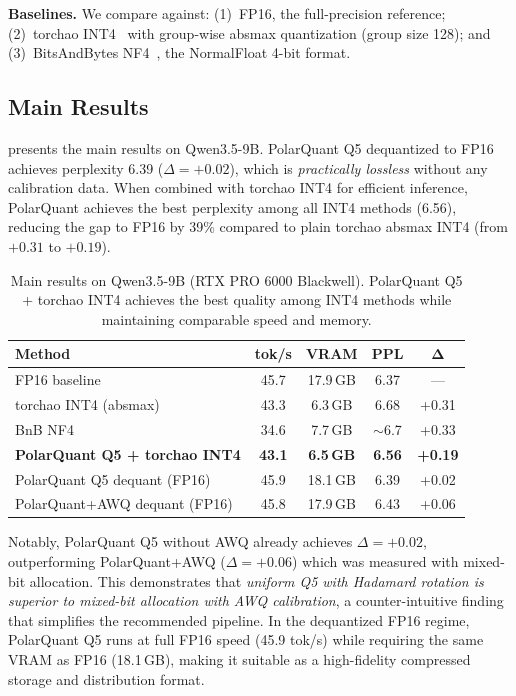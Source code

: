 \documentclass[10pt,twocolumn]{article}
\begin{document}
\textbf{Baselines.} We compare against: (1)~FP16, the full-precision reference; (2)~torchao INT4~\cite{torchao2024} with group-wise absmax quantization (group size 128); and (3)~BitsAndBytes NF4~\cite{dettmers2024qlora}, the NormalFloat 4-bit format.

\subsection{Main Results}
\label{sec:main_results}

 presents the main results on Qwen3.5-9B. PolarQuant Q5 dequantized to FP16 achieves perplexity 6.39 ($\Delta = +0.02$), which is \emph{practically lossless} without any calibration data. When combined with torchao INT4 for efficient inference, PolarQuant achieves the best perplexity among all INT4 methods (6.56), reducing the gap to FP16 by 39\% compared to plain torchao absmax INT4 (from $+0.31$ to $+0.19$).

\begin{table}[t]
\centering
\caption{Main results on Qwen3.5-9B (RTX PRO 6000 Blackwell). PolarQuant Q5 + torchao INT4 achieves the best quality among INT4 methods while maintaining comparable speed and memory.}
\label{tab:main}
\small
\begin{tabular}{@{}lcccc@{}}
\toprule
\textbf{Method} & \textbf{tok/s} & \textbf{VRAM} & \textbf{PPL} & $\bm{\Delta}$ \\
\midrule
FP16 baseline & 45.7 & 17.9\,GB & 6.37 & --- \\
\midrule
torchao INT4 (absmax) & 43.3 & 6.3\,GB & 6.68 & +0.31 \\
BnB NF4 & 34.6 & 7.7\,GB & ${\sim}$6.7 & +0.33 \\
\textbf{PolarQuant Q5 + torchao INT4} & \textbf{43.1} & \textbf{6.5\,GB} & \textbf{6.56} & \textbf{+0.19} \\
\midrule
PolarQuant Q5 dequant (FP16) & 45.9 & 18.1\,GB & 6.39 & +0.02 \\
PolarQuant+AWQ dequant (FP16) & 45.8 & 17.9\,GB & 6.43 & +0.06 \\
\bottomrule
\end{tabular}
\end{table}

Notably, PolarQuant Q5 without AWQ already achieves $\Delta = +0.02$, outperforming PolarQuant+AWQ ($\Delta = +0.06$) which was measured with mixed-bit allocation. This demonstrates that \emph{uniform Q5 with Hadamard rotation is superior to mixed-bit allocation with AWQ calibration}, a counter-intuitive finding that simplifies the recommended pipeline. In the dequantized FP16 regime, PolarQuant Q5 runs at full FP16 speed (45.9 tok/s) while requiring the same VRAM as FP16 (18.1\,GB), making it suitable as a high-fidelity compressed storage and distribution format.
\end{document}
